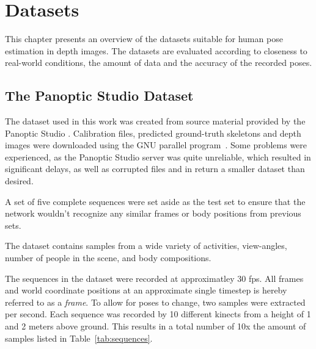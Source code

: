 \chapter{Datasets}

This chapter presents an overview of the datasets suitable for human pose estimation in depth images. The datasets are evaluated according to closeness to real-world conditions, the amount of data and the accuracy of the recorded poses.


\section{The Panoptic Studio Dataset}

The dataset used in this work was created from source material provided by the Panoptic Studio \cite{Joo_2015_ICCV, Joo_2017_TPAMI}. Calibration files, predicted ground-truth skeletons and depth images were downloaded using the GNU parallel program~\cite{Tange2011a}. Some problems were experienced, as the Panoptic Studio server was quite unreliable, which resulted in significant delays, as well as corrupted files and in return a smaller dataset than desired.

A set of five complete sequences were set aside as the test set to ensure that the network wouldn't recognize any similar frames or body positions from previous sets.

The dataset contains samples from a wide variety of activities, view-angles, number of people in the scene, and body compositions.

The sequences in the dataset were recorded at approximatley 30 fps. All frames and world coordinate positions at an approximate single timestep is hereby referred to as a \emph{frame}. To allow for poses to change, two samples were extracted per second. Each sequence was recorded by 10 different kinects from a height of 1 and 2 meters above ground. This results in a total number of 10x the amount of samples listed in Table~\ref{tab:sequences}.

